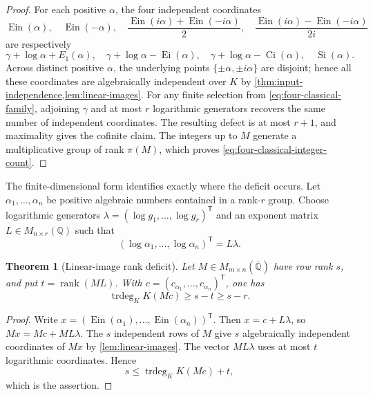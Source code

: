 \documentclass[11pt]{article}
\newtheorem{theorem}{Theorem}[section]
\theoremstyle{definition}
\theoremstyle{remark}
\newcommand{\Q}{\mathbb Q}
\newcommand{\Qbar}{\overline{\mathbb Q}}
\newcommand{\Ein}{\operatorname{Ein}}
\newcommand{\Ei}{\operatorname{Ei}}
\newcommand{\Ci}{\operatorname{Ci}}
\newcommand{\trdeg}{\operatorname{trdeg}}
\begin{document}
\begin{proof}
For each positive \(\alpha\), the four independent coordinates
\[
 \Ein(\alpha),\quad \Ein(-\alpha),\quad
 \frac{\Ein(i\alpha)+\Ein(-i\alpha)}2,\quad
 \frac{\Ein(i\alpha)-\Ein(-i\alpha)}{2i}
\]
are respectively
\[
 \gamma+\log\alpha+E_1(\alpha),\quad
 \gamma+\log\alpha-\Ei(\alpha),\quad
 \gamma+\log\alpha-\Ci(\alpha),\quad
 \operatorname{Si}(\alpha).
\]
Across distinct positive \(\alpha\), the underlying points
\(\{\pm\alpha,\pm i\alpha\}\) are disjoint; hence all these coordinates
are algebraically independent over \(K\) by
\cref{thm:input-independence,lem:linear-images}.  For any finite selection
from \eqref{eq:four-classical-family}, adjoining \(\gamma\) and at most
\(r\) logarithmic generators recovers the same number of independent
coordinates.  The resulting defect is at most \(r+1\), and maximality gives
the cofinite claim.  The integers up to \(M\) generate a multiplicative
group of rank \(\pi(M)\), which proves
\eqref{eq:four-classical-integer-count}.
\end{proof}

The finite-dimensional form identifies exactly where the deficit occurs.
Let \(\alpha_1,\ldots,\alpha_n\) be positive algebraic numbers contained in
a rank-\(r\) group.  Choose logarithmic generators
\(\lambda=(\log g_1,\ldots,\log g_r)^{\mathsf T}\) and an exponent matrix
\(L\in M_{n\times r}(\Q)\) such that
\begin{equation}\label{eq:log-exponent-matrix}
 (\log\alpha_1,\ldots,\log\alpha_n)^{\mathsf T}=L\lambda.
\end{equation}

\begin{theorem}[Linear-image rank deficit]
\label{thm:linear-rank-deficit}
Let \(M\in M_{m\times n}(\Qbar)\) have row rank \(s\), and put
\(t=\operatorname{rank}(ML)\).  With
\(c=(c_{\alpha_1},\ldots,c_{\alpha_n})^{\mathsf T}\), one has
\begin{equation}\label{eq:linear-rank-deficit}
 \boxed{\displaystyle
 \trdeg_KK(Mc)\ge s-t\ge s-r.}
\end{equation}
\end{theorem}

\begin{proof}
Write \(x=(\Ein(\alpha_1),\ldots,\Ein(\alpha_n))^{\mathsf T}\).  Then
\(x=c+L\lambda\), so \(Mx=Mc+ML\lambda\).  The \(s\) independent rows of
\(M\) give \(s\) algebraically independent coordinates of \(Mx\) by
\cref{lem:linear-images}.  The vector \(ML\lambda\) uses at most \(t\)
logarithmic coordinates.  Hence
\[
 s\le \trdeg_KK(Mc)+t,
\]
which is the assertion.
\end{proof}
\end{document}
